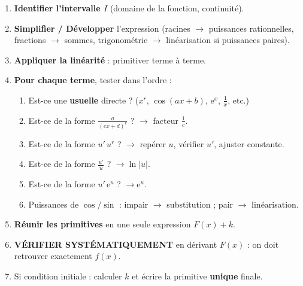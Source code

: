 \documentclass[11pt]{article}
\begin{document}
\begin{methode}
\begin{enumerate}
  \item \textbf{Identifier l'intervalle $I$} (domaine de la fonction, continuité).
  \item \textbf{Simplifier / Développer} l'expression (racines $\to$ puissances rationnelles, fractions $\to$ sommes, trigonométrie $\to$ linéarisation si puissances paires).
  \item \textbf{Appliquer la linéarité} : primitiver terme à terme.
  \item \textbf{Pour chaque terme}, tester dans l'ordre :
  \begin{enumerate}
    \item Est-ce une \textbf{usuelle} directe ? ($x^r$, $\cos(ax+b)$, $\mathrm{e}^x$, $\frac{1}{x}$, etc.)
    \item Est-ce de la forme $\frac{a}{(cx+d)^r}$ ? $\to$ facteur $\frac{1}{c}$.
    \item Est-ce de la forme $u'\,u^r$ ? $\to$ repérer $u$, vérifier $u'$, ajuster constante.
    \item Est-ce de la forme $\frac{u'}{u}$ ? $\to \ln|u|$.
    \item Est-ce de la forme $u'\,\mathrm{e}^u$ ? $\to \mathrm{e}^u$.
    \item Puissances de $\cos/\sin$ : impair $\to$ substitution ; pair $\to$ linéarisation.
  \end{enumerate}
  \item \textbf{Réunir les primitives} en une seule expression $F(x) + k$.
  \item \textbf{VÉRIFIER SYSTÉMATIQUEMENT} en dérivant $F(x)$ : on doit retrouver exactement $f(x)$.
  \item Si condition initiale : calculer $k$ et écrire la primitive \textbf{unique} finale.
\end{enumerate}
\end{methode}
\end{document}
